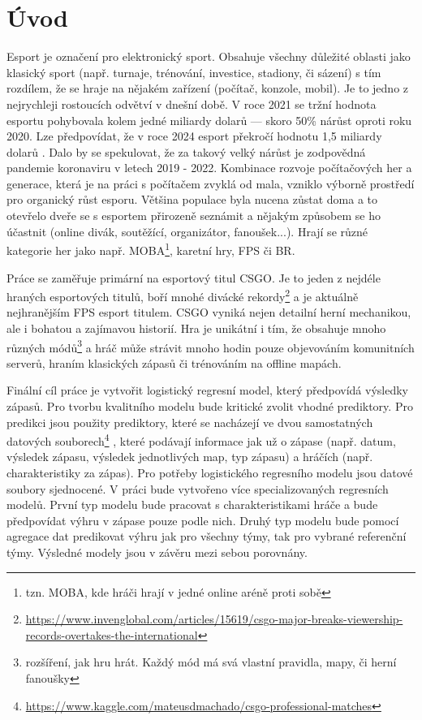 \chapter{Úvod}
Esport je označení pro elektronický sport. Obsahuje všechny důležité oblasti jako klasický sport (např. turnaje, trénování, investice, stadiony, či sázení)
s tím rozdílem, že se hraje na nějakém zařízení (počítač, konzole, mobil).
Je to jedno z nejrychleji rostoucích odvětví v dnešní době. V roce 2021 se tržní hodnota esportu pohybovala kolem jedné miliardy dolarů --- skoro
50\% nárůst oproti roku 2020. Lze předpovídat, že v roce 2024 esport překročí hodnotu 1,5 miliardy dolarů \cite{gough_esports_2021}.
Dalo by se spekulovat, že za takový velký nárůst je zodpovědná 
{\color{red}
pandemie koronaviru v letech 2019 - 2022. Kombinace rozvoje počítačových her a generace, která je na práci s počítačem zvyklá od mala, vzniklo výborně prostředí
pro organický růst esporu.
}
Většina populace
{\color{red}
byla
} nucena zůstat doma a to otevřelo dveře
se s esportem přirozeně seznámit a nějakým způsobem se ho účastnit (online divák, soutěžící, organizátor, fanoušek...). 
Hrají se různé kategorie her jako např. \ac{MOBA}\footnote{tzn. MOBA, kde hráči hrají v jedné online aréně proti sobě},
karetní hry, \ac{FPS} či \ac{BR}.

Práce se zaměřuje primární na esportový titul \acf{CSGO}. Je to jeden z nejdéle hraných esportových titulů, boří mnohé divácké
rekordy\footnote{\scriptsize \url{https://www.invenglobal.com/articles/15619/csgo-major-breaks-viewership-records-overtakes-the-international}}
a je aktuálně nejhranějším \ac{FPS} esport titulem. \ac{CSGO} vyniká nejen detailní herní mechanikou, ale i bohatou a zajímavou historií. Hra
je unikátní i tím, že obsahuje mnoho různých módů\footnote{rozšíření, jak hru hrát. Každý mód má svá vlastní pravidla, mapy, či herní fanoušky}
a hráč může strávit mnoho hodin pouze objevováním komunitních serverů, hraním klasických zápasů či trénováním na offline mapách.


Finální cíl práce je vytvořit logistický regresní model, který předpovídá výsledky zápasů. Pro tvorbu kvalitního modelu bude kritické zvolit vhodné prediktory.
Pro predikci jsou použity prediktory, které se nacházejí ve dvou samostatných datových souborech\footnote{\url{https://www.kaggle.com/mateusdmachado/csgo-professional-matches}} 
, které podávají informace jak už o zápase (např. datum, výsledek zápasu, výsledek jednotlivých map, typ zápasu) a hráčích 
{\color{red}
(např. charakteristiky za zápas).
Pro potřeby logistického regresního modelu jsou datové soubory sjednocené.
V práci bude vytvořeno více specializovaných regresních modelů. První typ modelu bude pracovat s charakteristikami hráče a bude předpovídat výhru v zápase pouze podle nich.
Druhý typ modelu bude pomocí agregace dat predikovat výhru jak pro všechny týmy, tak pro vybrané referenční týmy.
}
Výsledné modely jsou v závěru mezi sebou porovnány.

